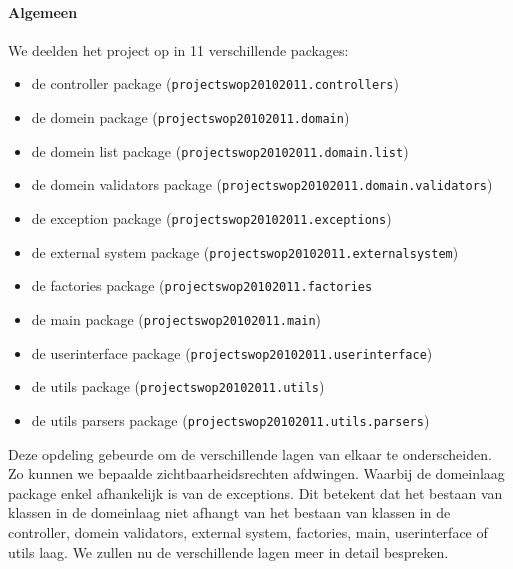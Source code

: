 \label{overzicht}
\paragraph{Algemeen}
We deelden het project op in 11 verschillende packages:
\begin{itemize}
  \item de controller package (\texttt{projectswop20102011.controllers})
  \item de domein package (\texttt{projectswop20102011.domain})
  \item de domein list package (\texttt{projectswop20102011.domain.list})
  \item de domein validators package (\texttt{projectswop20102011.domain.validators})
  \item de exception package (\texttt{projectswop20102011.exceptions})
  \item de external system package (\texttt{projectswop20102011.externalsystem})
  \item de factories package (\texttt{projectswop20102011.factories}
  \item de main package (\texttt{projectswop20102011.main})
  \item de userinterface package (\texttt{projectswop20102011.userinterface})
  \item de utils package (\texttt{projectswop20102011.utils})
  \item de utils parsers package (\texttt{projectswop20102011.utils.parsers})
\end{itemize}
Deze opdeling gebeurde om de verschillende lagen van elkaar te onderscheiden. Zo kunnen we bepaalde zichtbaarheidsrechten afdwingen. Waarbij de domeinlaag package enkel afhankelijk is van de exceptions.
Dit betekent dat het bestaan van klassen in de domeinlaag niet afhangt van het bestaan van klassen in de controller, domein validators, external system, factories, main, userinterface of utils laag.
We zullen nu de verschillende lagen meer in detail bespreken.

